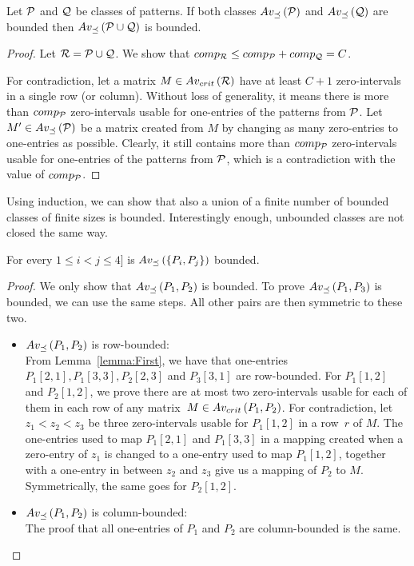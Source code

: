 \begin{thm}
\label{thm:boundunion}
Let $\mathcal{P}$ and $\mathcal{Q}$ be classes of patterns. If both classes $Av_{\preceq}\left(\mathcal{P}\right)$ and $Av_{\preceq}\left(\mathcal{Q}\right)$ are bounded then $Av_{\preceq}\left(\mathcal{P}\cup\mathcal{Q}\right)$ is bounded.
\end{thm}
\begin{proof}
Let $\mathcal{R}=\mathcal{P}\cup\mathcal{Q}$. We show that $comp_{\mathcal{R}}\leq comp_\mathcal{P}+comp_\mathcal{Q}=C$.

For contradiction, let a matrix $M\in Av_{crit}\left(\mathcal{R}\right)$ have at least $C+1$ zero-intervals in a single row (or column). Without loss of generality, it means there is more than $comp_{\mathcal{P}}$ zero-intervals usable for one-entries of the patterns from $\mathcal{P}$. Let $M'\in Av_{\preceq}\left(\mathcal{P}\right)$ be a matrix created from $M$ by changing as many zero-entries to one-entries as possible. Clearly, it still contains more than $comp_{\mathcal{P}}$ zero-intervals usable for one-entries of the patterns from $\mathcal{P}$, which is a contradiction with the value of $comp_{\mathcal{P}}$.
\end{proof}

Using induction, we can show that also a union of a finite number of bounded classes of finite sizes is bounded. Interestingly enough, unbounded classes are not closed the same way.

\begin{thm}
For every $1\leq i<j\leq4]$ is $Av_{\preceq}\left(\{P_i,P_j\}\right)$ bounded.
\end{thm}
\begin{proof}
We only show that $Av_{\preceq}\left(P_1,P_2\right)$ is bounded. To prove $Av_{\preceq}\left(P_1,P_3\right)$ is bounded, we can use the same steps. All other pairs are then symmetric to these two.
\begin{itemize}
	\item $Av_{\preceq}\left(P_1,P_2\right)$ is row-bounded:\\
	From Lemma~\ref{lemma:First}, we have that one-entries $P_1[2,1],P_1[3,3],P_2[2,3]$ and $P_3[3,1]$ are row-bounded. For $P_1[1,2]$ and $P_2[1,2]$, we prove there are at most two zero-intervals usable for each of them in each row of any matrix~$M\in Av_{crit}\left(P_1,P_2\right)$. For contradiction, let $z_1<z_2<z_3$ be three zero-intervals usable for $P_1[1,2]$ in a row~$r$ of $M$. The one-entries used to map $P_1[2,1]$ and $P_1[3,3]$ in a mapping created when a zero-entry of $z_1$ is changed to a one-entry used to map $P_1[1,2]$, together with a one-entry in between $z_2$ and $z_3$ give us a mapping of $P_2$ to $M$. Symmetrically, the same goes for $P_2[1,2]$.
	\item $Av_{\preceq}\left(P_1,P_2\right)$ is column-bounded:\\
	The proof that all one-entries of $P_1$ and $P_2$ are column-bounded is the same. \qedhere
\end{itemize}
\end{proof}


